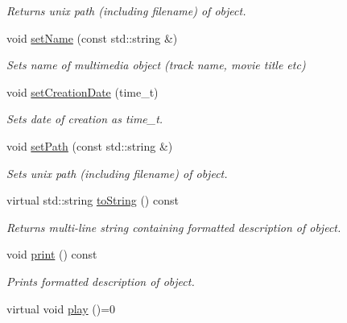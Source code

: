 \begin{DoxyCompactItemize}
\begin{DoxyCompactList}\small\item\em Returns unix path (including filename) of object. \end{DoxyCompactList}\item 
\hypertarget{classBaseObject_a7d8dca471d4e0eb15620f518f48d2a8c}{void \hyperlink{classBaseObject_a7d8dca471d4e0eb15620f518f48d2a8c}{set\+Name} (const std\+::string \&)}\label{classBaseObject_a7d8dca471d4e0eb15620f518f48d2a8c}

\begin{DoxyCompactList}\small\item\em Sets name of multimedia object (track name, movie title etc) \end{DoxyCompactList}\item 
\hypertarget{classBaseObject_aeeb327051d61bd727722f583fa0bc41c}{void \hyperlink{classBaseObject_aeeb327051d61bd727722f583fa0bc41c}{set\+Creation\+Date} (time\+\_\+t)}\label{classBaseObject_aeeb327051d61bd727722f583fa0bc41c}

\begin{DoxyCompactList}\small\item\em Sets date of creation as time\+\_\+t. \end{DoxyCompactList}\item 
\hypertarget{classBaseObject_a7841749de25678d8cbedf021e760cbee}{void \hyperlink{classBaseObject_a7841749de25678d8cbedf021e760cbee}{set\+Path} (const std\+::string \&)}\label{classBaseObject_a7841749de25678d8cbedf021e760cbee}

\begin{DoxyCompactList}\small\item\em Sets unix path (including filename) of object. \end{DoxyCompactList}\item 
\hypertarget{classBaseObject_aab08eee6684fdfa0852b1f914379b9c4}{virtual std\+::string \hyperlink{classBaseObject_aab08eee6684fdfa0852b1f914379b9c4}{to\+String} () const }\label{classBaseObject_aab08eee6684fdfa0852b1f914379b9c4}

\begin{DoxyCompactList}\small\item\em Returns multi-\/line string containing formatted description of object. \end{DoxyCompactList}\item 
void \hyperlink{classBaseObject_a9bad65dddde7dec1ea622edce664cc9f}{print} () const 
\begin{DoxyCompactList}\small\item\em Prints formatted description of object. \end{DoxyCompactList}\item 
\hypertarget{classBaseObject_a63e43537301807233867a3b61052f5a6}{virtual void \hyperlink{classBaseObject_a63e43537301807233867a3b61052f5a6}{play} ()=0}\label{classBaseObject_a63e43537301807233867a3b61052f5a6}


\end{DoxyCompactItemize}
